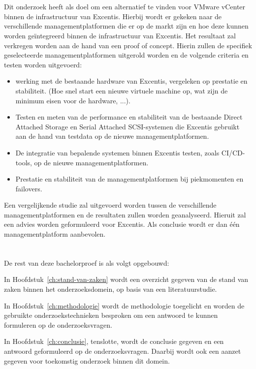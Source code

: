 \section{}%
\label{sec:onderzoeksdoelstelling}
Dit onderzoek heeft als doel om een alternatief te vinden voor VMware vCenter binnen de infrastructuur van Excentis. Hierbij wordt er gekeken naar de verschillende managementplatformen die er op de markt zijn en hoe deze kunnen worden geïntegreerd binnen de infrastructuur van Excentis.
Het resultaat zal verkregen worden aan de hand van een proof of concept. Hierin zullen de specifiek geselecteerde managementplatformen uitgerold worden en de volgende criteria en testen worden uitgevoerd:
\begin{itemize}
  \item werking met de bestaande hardware van Excentis, vergeleken op prestatie en stabiliteit. (Hoe snel start een nieuwe virtuele machine op, wat zijn de minimum eisen voor de hardware, ...).
  \item Testen en meten van de performance en stabiliteit van de bestaande Direct Attached Storage en Serial Attached SCSI-systemen die Excentis gebruikt aan de hand van testdata op de nieuwe managementplatformen.
  \item De integratie van bepalende systemen binnen Excentis testen, zoals CI/CD-tools, op de nieuwe managementplatformen.
  \item Prestatie en stabiliteit van de managementplatformen bij piekmomenten en failovers.
  \end{itemize}
Een vergelijkende studie zal uitgevoerd worden tussen de verschillende managementplatformen en de resultaten zullen worden geanalyseerd. Hieruit zal een advies worden geformuleerd voor Excentis.
Als conclusie wordt er dan één managementplatform aanbevolen.

\section{}%
\label{sec:opzet-bachelorproef}


De rest van deze bachelorproef is als volgt opgebouwd:

In Hoofdstuk~\ref{ch:stand-van-zaken} wordt een overzicht gegeven van de stand van zaken binnen het onderzoeksdomein, op basis van een literatuurstudie.

In Hoofdstuk~\ref{ch:methodologie} wordt de methodologie toegelicht en worden de gebruikte onderzoekstechnieken besproken om een antwoord te kunnen formuleren op de onderzoeksvragen.


In Hoofdstuk~\ref{ch:conclusie}, tenslotte, wordt de conclusie gegeven en een antwoord geformuleerd op de onderzoeksvragen. Daarbij wordt ook een aanzet gegeven voor toekomstig onderzoek binnen dit domein.